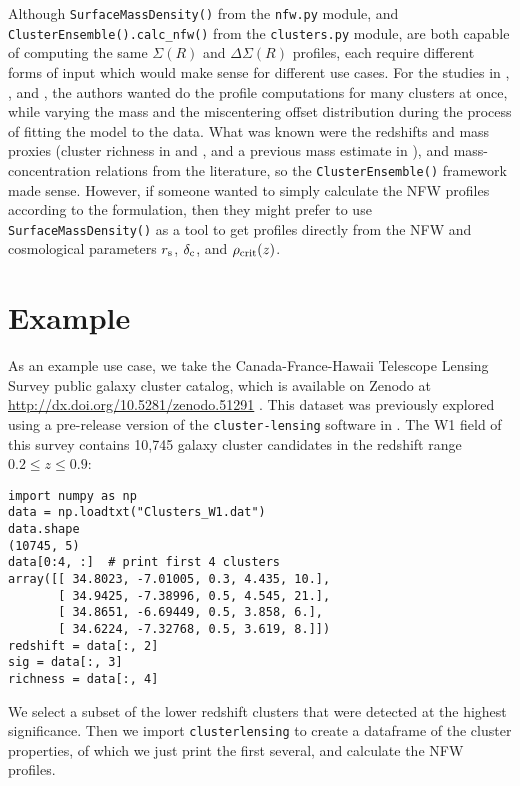 \documentclass[twocolumn]{aastex6}
\newcommand{\code}{\lstinline[style=codeintext]}
\begin{document}
Although \code{SurfaceMassDensity()} from the \code{nfw.py} module, and \code{ClusterEnsemble().calc_nfw()} from the \code{clusters.py} module, are both capable of computing the same $\Sigma(R)$ and $\Delta\Sigma(R)$ profiles, each require different forms of input which would make sense for different use cases. For the studies in \citet{Ford15}, \citet{Ford14}, and \citet{Ford12}, the authors wanted do the profile computations for many clusters at once, while varying the mass and the miscentering offset distribution during the process of fitting the model to the data. What was known were the redshifts and mass proxies (cluster richness in \citealt{Ford15} and \citealt{Ford14}, and a previous mass estimate in \citealt{Ford12}), and mass-concentration relations from the literature, so the \code{ClusterEnsemble()} framework made sense. However, if someone wanted to simply calculate the NFW profiles according to the \citet{Wright00} formulation, then they might prefer to use \code{SurfaceMassDensity()} as a tool to get profiles directly from the NFW and cosmological parameters $r_{\rm s}$, $\delta_{\rm c}$, and $\rho_{\rm crit}(z)$.


\section{Example}
\label{ex}
As an example use case, we take the Canada-France-Hawaii Telescope Lensing Survey \citep[CFHTLenS;][]{Heymans12, Erben13} public galaxy cluster catalog, which is available on Zenodo at \url{http://dx.doi.org/10.5281/zenodo.51291} \citep{3DMFcatalog}. This dataset was previously explored using a pre-release version of the \code{cluster-lensing} software in \citet{Ford14, Ford15}. The W1 field of this survey contains 10,745 galaxy cluster candidates in the redshift range $0.2 \le z \le 0.9$:

\begin{lstlisting}
import numpy as np
data = np.loadtxt("Clusters_W1.dat")
data.shape
(10745, 5)
data[0:4, :]  # print first 4 clusters
array([[ 34.8023, -7.01005, 0.3, 4.435, 10.],
       [ 34.9425, -7.38996, 0.5, 4.545, 21.],
       [ 34.8651, -6.69449, 0.5, 3.858, 6.],
       [ 34.6224, -7.32768, 0.5, 3.619, 8.]])
redshift = data[:, 2]
sig = data[:, 3]
richness = data[:, 4]
\end{lstlisting}

We select a subset of the lower redshift clusters that were detected at the highest significance. Then we import \code{clusterlensing} to create a dataframe of the cluster properties, of which we just print the first several, and calculate the NFW profiles.
\end{document}
